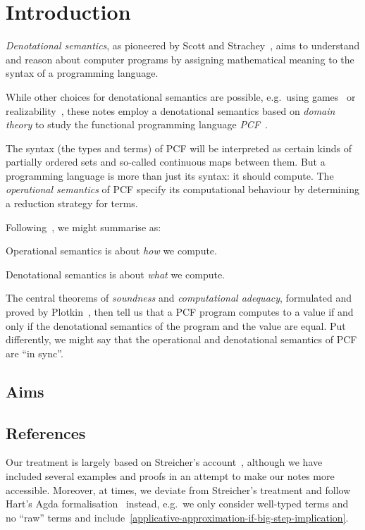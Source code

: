 \chapter{Introduction}

\emph{Denotational semantics}, as pioneered by Scott and
Strachey~\cite{Scott1970,ScottStrachey1971}, aims to understand and reason about
computer programs by assigning mathematical meaning to the syntax of a
programming language.

While other choices for denotational semantics are possible, e.g.\ using
games~\cite{Abramsky1997,Hyland1997} or realizability~\cite{Longley1995}, these
notes employ a denotational semantics based on \emph{domain theory} to study the
functional programming language \emph{PCF}~\cite{Plotkin1977,Scott1993}.

The syntax (the types and terms) of PCF will be interpreted as certain kinds of
partially ordered sets and so-called continuous maps between them.
%
But a programming language is more than just its syntax: it should compute. The
\emph{operational semantics} of PCF specify its computational behaviour by
determining a reduction strategy for terms.

Following~\cite{Escardo2007}, we might summarise as:

\begin{displayquote}
  Operational semantics is about \emph{how} we compute.

  Denotational semantics is about \emph{what} we compute.
\end{displayquote}

The central theorems of \emph{soundness} and \emph{computational adequacy},
formulated and proved by Plotkin~\cite{Plotkin1977}, then tell us that a PCF
program computes to a value if and only if the denotational semantics of the
program and the value are equal.
%
Put differently, we might say that the operational and denotational semantics of
PCF are ``in sync''.


\cite{Escardo2007b}

\section{Aims}

\section{References}

Our treatment is largely based on Streicher's account~\cite{Streicher2006},
although we have included several examples and proofs in an attempt to make our
notes more accessible.
%
Moreover, at times, we deviate from Streicher's treatment and follow Hart's Agda
formalisation~\cite{Hart2020} instead, e.g.\ we only consider well-typed terms
and no ``raw'' terms and
include~\cref{applicative-approximation-if-big-step-implication}.

